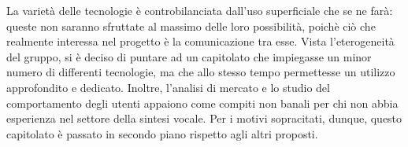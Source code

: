 La varietà delle tecnologie è controbilanciata dall'uso superficiale che se ne farà: queste non saranno sfruttate al massimo delle loro possibilità, poichè ciò che realmente interessa nel progetto è la comunicazione tra esse. Vista l'eterogeneità del gruppo, si è deciso di puntare ad un capitolato che impiegasse un minor numero di differenti tecnologie, ma che allo stesso tempo permettesse un utilizzo approfondito e dedicato. Inoltre, l'analisi di mercato e lo studio del comportamento
degli utenti appaiono come compiti non banali per chi non abbia esperienza nel settore della sintesi vocale. Per i motivi sopracitati, dunque, questo capitolato è passato in secondo piano rispetto agli altri proposti.
